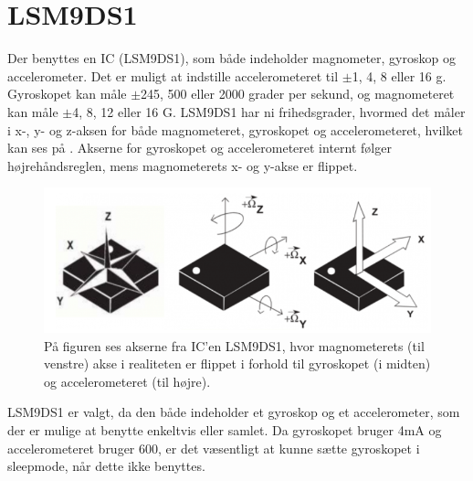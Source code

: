 \section{LSM9DS1}
Der benyttes en IC (LSM9DS1), som både indeholder magnometer, gyroskop og accelerometer. Det er muligt at indstille accelerometeret til $\pm$1, 4, 8 eller 16 g. Gyroskopet kan måle $\pm$245, 500 eller 2000 grader per sekund, og magnometeret kan måle $\pm$4, 8, 12 eller 16 G.\citep{Jimb02016} \newline
LSM9DS1 har ni frihedsgrader, hvormed det måler i x-, y- og z-aksen for både magnometeret, gyroskopet og accelerometeret, hvilket kan ses på . Akserne for gyroskopet og accelerometeret internt følger højrehåndsreglen, mens magnometerets x- og y-akse er flippet.\citep{Jimb02016}

\begin{figure}[H]
	\centering
	\includegraphics[scale=0.6]{figures/cDesign/LSM9DS1.png}
	\caption{På figuren ses akserne fra IC'en LSM9DS1, hvor magnometerets (til venstre) akse i realiteten er flippet i forhold til gyroskopet (i midten) og accelerometeret (til højre).\citep{Jimb02016}}
	\label{fig:sensor_placering}
\end{figure}

LSM9DS1 er valgt, da den både indeholder et gyroskop og et accelerometer, som der er mulige at benytte enkeltvis eller samlet. Da gyroskopet bruger 4mA og accelerometeret bruger 600\textmuA, er det væsentligt at kunne sætte gyroskopet i sleepmode, når dette ikke benyttes. 